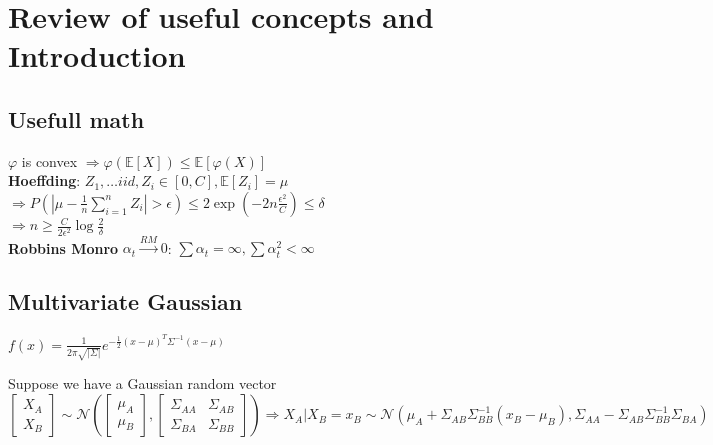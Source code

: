 \section{Review of useful concepts and Introduction}

\subsection{Usefull math}
$\varphi$ is convex $\Rightarrow \varphi(\mathbb{E}[X]) \leq  \mathbb{E}[\varphi(X)]$\\
\textbf{Hoeffding}: $Z_1,\dots iid, Z_i\in [0,C], \mathbb{E}[Z_i]=\mu$\\
$\Rightarrow P\left(\left\lvert \mu - \frac{1}{n}\sum_{i=1}^n Z_i\right\rvert > \epsilon \right)\leq 2 \exp(-2n\frac{\epsilon^2}{C})\leq \delta$\\
$\Rightarrow n \geq \frac{C}{2\epsilon^2}\log\frac{2}{\delta}$\\
\textbf{Robbins Monro} $\alpha_t \xrightarrow{RM} 0$: $\sum \alpha_t = \infty, \sum \alpha_t^2 < \infty$ 
\subsection{Multivariate Gaussian}
$f(x) = \frac{1}{2\pi \sqrt{|\Sigma|}} e^{- \frac{1}{2} (x-\mu)^T \Sigma^{-1} (x-\mu)}$

Suppose we have a Gaussian random vector
\(
\begin{bmatrix} 
    X_A \\ 
    X_B 
\end{bmatrix} 
\sim \mathcal{N}\left(
\begin{bmatrix}
    {\mu_A} \\ 
    {\mu_B}
\end{bmatrix},
\begin{bmatrix} 
    \Sigma_{AA}&\Sigma_{AB} \\
    \Sigma_{BA}&\Sigma_{BB} 
\end{bmatrix}\right)
\Rightarrow X_A\vert X_B=x_B \sim \mathcal{N}\left(
    \mu_A+\Sigma_{AB}\Sigma^{-1}_{BB}(x_B-\mu_B) , 
    \Sigma_{AA}-\Sigma_{AB}\Sigma^{-1}_{BB}\Sigma_{BA}
\right)
\)



